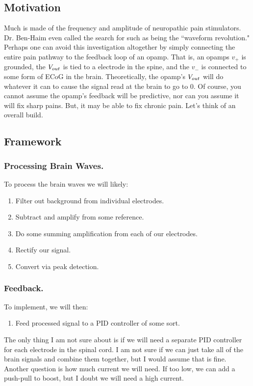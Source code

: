 \subsection{Motivation}
Much is made of the frequency and amplitude of neuropathic pain stimulators. Dr. Ben-Haim even called the search for such as being the ``waveform revolution." Perhaps one can avoid this investigation altogether by simply connecting the entire pain pathway to the feedback loop of an opamp. That is, an opamps $v_+$ is grounded, the ${V}_{out}$ is tied to a electrode in the spine, and the $v_-$ is connected to some form of ECoG in the brain. Theoretically, the opamp's ${V}_{out}$ will do whatever it can to cause the signal read at the brain to go to 0. Of course, you cannot assume the opamp's feedback will be predictive, nor can you assume it will fix sharp pains. But, it may be able to fix chronic pain. Let's think of an overall build. 

\subsection{Framework}

\subsubsection{Processing Brain Waves.}
To process the brain waves we will likely:

\begin{enumerate}
    \item Filter out background from individual electrodes. 
    \item Subtract and amplify from some reference.
    \item Do some summing amplification from each of our electrodes.
    \item Rectify our signal.
    \item Convert via peak detection.
\end{enumerate}

\subsubsection{Feedback.}
To implement, we will then: 

\begin{enumerate}
    \item Feed processed signal to a PID controller of some sort.
\end{enumerate}

The only thing I am not sure about is if we will need a separate PID controller for each electrode in the spinal cord. I am not sure if we can just take all of the brain signals and combine them together, but I would assume that is fine. Another question is how much current we will need. If too low, we can add a push-pull to boost, but I doubt we will need a high current. 












